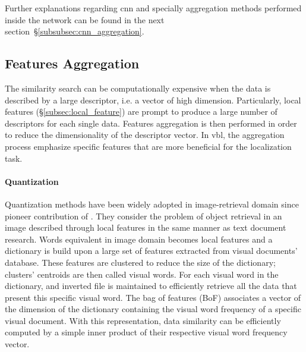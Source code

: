 Further explanations regarding \ac{cnn} and specially aggregation methods performed inside the network can be found in the next section~\S\ref{subsubsec:cnn_aggregation}.

\subsection{Features Aggregation}
\label{subsec:features_aggregation}
The similarity search can be computationally expensive when the data is described by a large descriptor, i.e. a vector of high dimension. Particularly, local features (\S\ref{subsec:local_feature}) are prompt to produce a large number of descriptors for each single data. Features aggregation is then performed in order to reduce the dimensionality of the descriptor vector. In \ac{vbl}, the aggregation process emphasize specific features that are more beneficial for the localization task.

\paragraph{Quantization}
Quantization methods have been widely adopted in image-retrieval domain since pioneer contribution of \citet{Sivic2003}. They consider the problem of object retrieval in an image described through local features in the same manner as text document research. Words equivalent in image domain becomes local features and a dictionary is build upon a large set of features extracted from visual documents' database. These features are clustered to reduce the size of the dictionary; clusters' centroids are then called visual words. For each visual word in the dictionary, and inverted file is maintained to efficiently retrieve all the data that present this specific visual word. The bag of features (BoF) associates a vector of the dimension of the dictionary containing the visual word frequency of a specific visual document. With this representation, data similarity can be efficiently computed by a simple inner product of their respective visual word frequency vector.


